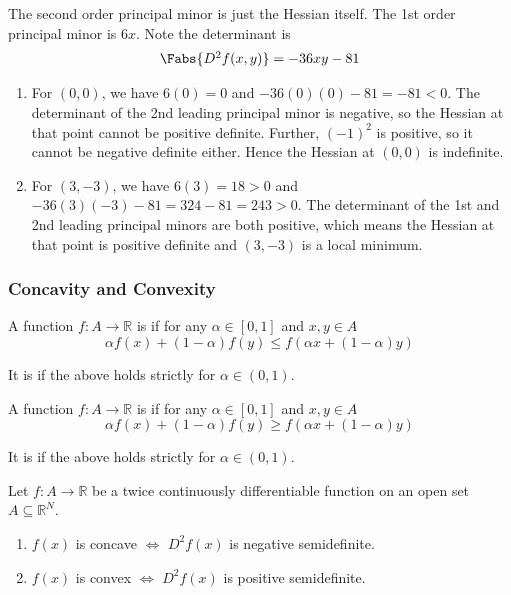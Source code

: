 \documentclass{article}
\begin{document}
The second order principal minor is just the Hessian itself. The 1st order principal minor is $6x$. Note the determinant is
\begin{equation}
  \begin{array}{c}
    \Fabs{D^2 f(x, y)} = -36xy - 81
  \end{array}
  \nonumber
\end{equation}

\begin{enumerate}
  \item For $(0, 0)$, we have $6(0) = 0$ and $-36(0)(0) - 81 = -81 < 0$. The determinant of the 2nd leading principal minor is negative, so the Hessian at that point cannot be positive definite. Further, $(-1)^2$ is positive, so it cannot be negative definite either. Hence the Hessian at $(0, 0)$ is indefinite.

  \item For $(3, -3)$, we have $6(3) = 18 > 0$ and $-36(3)(-3) - 81 = 324 - 81 = 243 > 0$. The determinant of the 1st and 2nd leading principal minors are both positive, which means the Hessian at that point is positive definite and $(3, -3)$ is a local minimum.
\end{enumerate}

\subsubsection{Concavity and Convexity}
\label{ssub:concavity_and_convexity}

\begin{definition}
  A function $f: A \to \mathbb{R}$ is  if for any $\alpha \in [0, 1]$ and $x, y \in A$
  \[
    \alpha f(x) + (1 - \alpha) f(y)
    \le
    f(\alpha x + (1 - \alpha) y)
  \]

  It is  if the above holds strictly for $\alpha \in (0, 1)$.
\end{definition}

\begin{definition}
  A function $f: A \to \mathbb{R}$ is  if for any $\alpha \in [0, 1]$ and $x, y \in A$
  \[
    \alpha f(x) + (1 - \alpha) f(y)
    \ge
    f(\alpha x + (1 - \alpha) y)
  \]

  It is  if the above holds strictly for $\alpha \in (0, 1)$.
\end{definition}

\begin{theorem}
  Let $f: A \to \mathbb{R}$ be a twice continuously differentiable function on an open set $A \subseteq \mathbb{R}^N$.
  \begin{enumerate}
    \item $f(x)$ is concave $\iff$ $D^2f(x)$ is negative semidefinite.
    \item $f(x)$ is convex $\iff$ $D^2f(x)$ is positive semidefinite.
  \end{enumerate}
\end{theorem}
\end{document}
